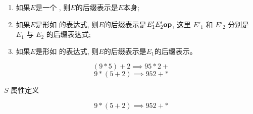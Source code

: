 
\begin{frame}{}
  \begin{definition}
    \begin{enumerate}[(1)]
      \setlength{\itemsep}{8pt}
      \item 如果$E$是一个 , 则$E$的后缀表示是$E$本身;
      \item 如果$E$是形如  的表达式,
        则$E$的后缀表示是$E'_{1} E'_{2} \text{\bf op}$,
        这里 $E'_{1}$ 和 $E'_{2}$ 分别是 $E_{1}$ 与 $E_{2}$ 的后缀表达式;
      \item 如果$E$是形如  的表达式, 则$E$的后缀表示是$E_{1}$的后缀表示。
    \end{enumerate}
  \end{definition}

  \begin{center}
    \[
      (9 * 5)+2 \implies 95*2+
    \]
    \[
      9 * (5+2) \implies 952+*
    \]
  \end{center}
\end{frame}

\begin{frame}{}
  \begin{center}
     $S$ 属性定义

		\vspace{0.50cm}
	\end{center}
\end{frame}

\begin{frame}{}
  \begin{center}
	\end{center}

	\vspace{-0.30cm}
	\[
		9 * (5+2) \implies 952+*
	\]
\end{frame}

